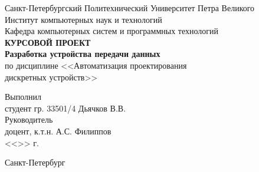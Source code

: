 \begin{titlepage}
\begin{center}
	Санкт-Петербургский Политехнический Университет Петра Великого\\[3mm]
	Институт компьютерных наук и технологий \\[3mm]
	Кафедра компьютерных систем и программных технологий\\[6cm]
	
	\textbf{КУРСОВОЙ ПРОЕКТ}\\[3mm]
	\textbf{Разработка устройства передачи данных}\\[3mm]
	по дисциплине <<Автоматизация проектирования\\[3mm] 
	дискретных устройств>>\\[5cm]
\end{center}

\begin{flushleft}
	Выполнил\\[3mm]
	студент гр. 33501/4  \hspace*{7.1cm} Дьячков В.В.\\[3mm]
	Руководитель\\[3mm]
	доцент, к.т.н. \hspace*{8.5cm} А.С. Филиппов\\[4mm]
	\hspace*{11.5cm} <<\sign[7mm]>> \sign[20mm] \the\year\hspace{1mm} г.
\end{flushleft}

\vfill

\begin{center}
	Санкт-Петербург\\
	\the\year
\end{center}
\end{titlepage}

\addtocounter{page}{1}

